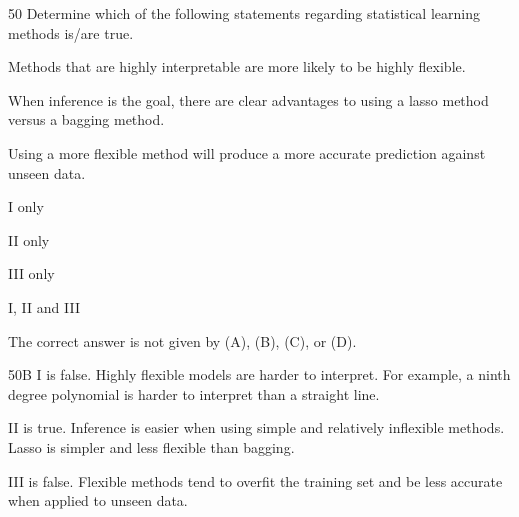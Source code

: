 \begin{question}{50}
Determine which of the following statements regarding statistical learning methods is/are true.

\begin{statements}
\item Methods that are highly interpretable are more likely to be highly flexible.
\item When inference is the goal, there are clear advantages to using a lasso method versus a bagging method.
\item Using a more flexible method will produce a more accurate prediction against unseen data.
\end{statements}

\begin{choices}
\item I only
\item II only
\item III only
\item I, II and III
\item The correct answer is not given by (A), (B), (C), or (D).
\end{choices}
\end{question}
\begin{solution}{50}{B}
I is false. Highly flexible models are harder to interpret. For example, a ninth degree polynomial is harder to interpret than a straight line.

II is true. Inference is easier when using simple and relatively inflexible methods. Lasso is simpler and less flexible than bagging.

III is false. Flexible methods tend to overfit the training set and be less accurate when applied to unseen data.
\end{solution}

